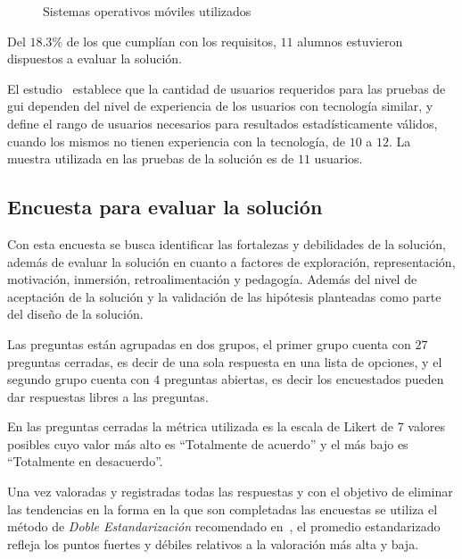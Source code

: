 \begin{figure}
\centering
{}
\caption{Sistemas operativos móviles utilizados}
\label{fig:ubicacion_sistemas_operativos}
\end{figure}


Del $18.3\%$ de los que cumplían con los requisitos, $11$ alumnos estuvieron
dispuestos a evaluar la solución. 

El estudio~\cite{nielsen2000} establece que la cantidad de usuarios requeridos
para las pruebas de \gls{gui} dependen del nivel de experiencia de los usuarios
con tecnología similar, y~\cite{ritch2009} define el rango de usuarios
necesarios para resultados estadísticamente válidos, cuando los mismos no tienen
experiencia con la tecnología, de $10$ a $12$. La muestra utilizada en las
pruebas de la solución es de $11$ usuarios.

\subsection{Encuesta para evaluar la solución}
\label{encuesta_solucion}
Con esta encuesta se busca identificar las fortalezas y debilidades de la 
solución, además de evaluar la solución en cuanto a factores de exploración, 
representación, motivación, inmersión, retroalimentación y pedagogía. Además del nivel 
de aceptación de la solución y la validación de las 
hipótesis planteadas como parte del diseño de la solución.

Las preguntas están agrupadas en dos grupos, el primer grupo cuenta con $27$ 
preguntas cerradas, es decir de una sola respuesta en una lista de opciones, 
y el segundo grupo cuenta con $4$ preguntas abiertas, es decir los encuestados 
pueden dar respuestas libres a las preguntas. 

En las preguntas cerradas la métrica utilizada es la escala de Likert
\cite{Allen:2007} de 7 valores posibles cuyo valor más alto es
\enquote{Totalmente de acuerdo} y el más bajo es \enquote{Totalmente en 
desacuerdo}. 

Una vez valoradas y registradas todas las respuestas y con el 
objetivo de eliminar las tendencias en la forma en la que son completadas las
encuestas\cite{Fischer2010} se utiliza el método de \emph{Doble 
Estandarización} recomendado en~\cite{Pagolu2011}, el promedio estandarizado 
refleja los puntos fuertes y débiles relativos a la valoración más alta y baja.

